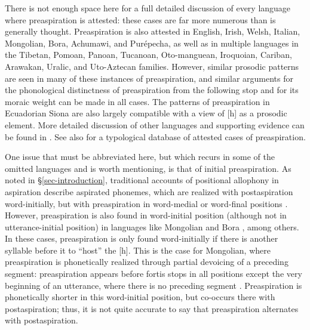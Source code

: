 \documentclass[output=paper,colorlinks,citecolor=brown]{langscibook}
\begin{document}
There is not enough space here for a full detailed discussion of every language where preaspiration is attested: these cases are far more numerous than is generally thought. Preaspiration is also attested in English, Irish, Welsh, Italian, Mongolian, Bora, Achumawi, and Purépecha, as well as in multiple languages in the Tibetan, Pomoan, Panoan, Tucanoan, Oto-manguean, Iroquoian, Cariban, Arawakan, Uralic, and Uto-Aztecan families. However, similar prosodic patterns are seen in many of these instances of preaspiration, and similar arguments for the phonological distinctness of preaspiration from the following stop and for its moraic weight can be made in all cases. The patterns of preaspiration in Ecuadorian Siona  are also largely compatible with a view of [h] as a prosodic element. More detailed discussion of other languages and supporting evidence 
can be found in \citet{craioveanu-thesis}. See also  for a typological database of attested cases of preaspiration.


One issue that must be abbreviated here, but which recurs in some of the omitted languages and is worth mentioning, is that of initial preaspiration. As noted in \S\ref{sec-introduction}, traditional accounts of positional allophony in aspiration describe aspirated phonemes, which are realized with postaspiration word-initially, but with preaspiration in word-medial or word-final positions \citep[e.g.,][]{LadefogedMaddieson1996,Silverman2003,Clayton:2010}. However, preaspiration is also found in word-initial position (although not in utterance-initial position) in languages like Mongolian \citep{svantesson2005,svantessonkarlsson2012} and Bora \citep{thiesen1998,thiesenweber2012}, among others. In these cases, preaspiration is only found word-initially if there is another syllable before it to ``host'' the [h]. This is the case for Mongolian, where preaspiration is phonetically realized through partial devoicing of a preceding segment: preaspiration appears before fortis stops in all positions except the very beginning of an utterance, where there is no preceding segment \citep{svantessonkarlsson2012}. Preaspiration is phonetically shorter in this word-initial position, but co-occurs there with postaspiration; thus, it is not quite accurate to say that preaspiration alternates with postaspiration. 
\end{document}
